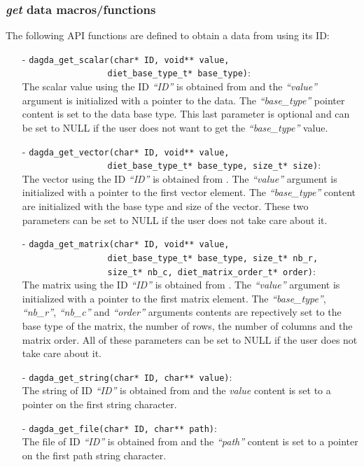 \subsubsection{\dagda \textit{get} data macros/functions}
\label{sec:syncGetFunctions}
The following API functions are defined to obtain a data from \dagda
using its ID:
\begin{itemize}
  \item[-] \verb#dagda_get_scalar(char* ID, void** value,#\\
           \verb#                 diet_base_type_t* base_type)#:\\
    The scalar value using the ID \textit{``ID''} is obtained from
    \dagda and the \textit{``value''} argument is initialized with a
    pointer to the data.  The \textit{``base\_type''} pointer content is
    set to the data base type. This last parameter is optional and
    can be set to NULL if the user does not want to get the
    \textit{``base\_type''} value.

  \item[-] \verb#dagda_get_vector(char* ID, void** value,#\\
           \verb#                 diet_base_type_t* base_type, size_t* size)#:\\
    The vector using the ID \textit{``ID''} is obtained from \dagda. The
    \textit{``value''} argument is initialized with a pointer to the
    first vector element. The \textit{``base\_type''} content are
    initialized with the base type and size of the vector. These two
    parameters can be set to NULL if the user does not take care about
    it.
  \item[-] \verb#dagda_get_matrix(char* ID, void** value,#\\
           \verb#                 diet_base_type_t* base_type, size_t* nb_r,#\\
           \verb#                 size_t* nb_c, diet_matrix_order_t* order)#:\\
    The matrix using the ID \textit{``ID''} is obtained from \dagda. The
    \textit{``value''} argument is initialized with a pointer to the
    first matrix element. The \textit{``base\_type''}, \textit{``nb\_r''},
    \textit{``nb\_c''} and \textit{``order''} arguments contents are
    repectively set to the base type of the matrix, the number of
    rows, the number of columns and the matrix order. All of these
    parameters can be set to NULL if the user does not take care about
    it.
  \item[-] \verb#dagda_get_string(char* ID, char** value)#:\\
    The string of ID \textit{``ID''} is obtained from \dagda and the
    \textit{value} content is set to a pointer on the first string character.
  \item[-] \verb#dagda_get_file(char* ID, char** path)#:\\
    The file of ID \textit{``ID''} is obtained from \dagda and the
    \textit{``path''} content is set to a pointer on the first path string
    character.
\end{itemize}

